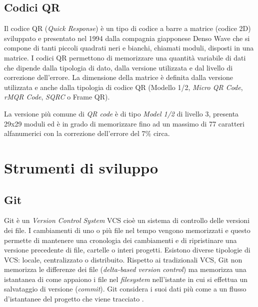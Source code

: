 %
\subsection{Codici QR}
Il codice QR (\textit{Quick Response}) è un tipo di codice a barre a matrice (codice 2D) sviluppato e presentato nel 1994 dalla compagnia giapponese Denso Wave che si compone di tanti piccoli quadrati neri e bianchi, chiamati moduli, disposti in una matrice.
I codici QR permettono di memorizzare una quantità variabile di dati che dipende dalla tipologia di dato, dalla versione utilizzata e dal livello di correzione dell'errore. La dimensione della matrice è definita dalla versione utilizzata e anche dalla tipologia di codice QR (Modello 1/2, \textit{Micro QR Code}, \textit{rMQR Code}, \textit{SQRC} o Frame QR).

La versione più comune di \textit{QR code} è di tipo \textit{Model 1/2} di livello 3, presenta 29x29 moduli ed è in grado di memorizzare fino ad un massimo di 77 caratteri alfanumerici con la correzione dell'errore del 7\% circa.

%
\section{Strumenti di sviluppo}
\subsection{Git}
Git è un \textit{Version Control System} VCS cioè un sistema di controllo delle versioni dei file. I cambiamenti di uno o più file nel tempo vengono memorizzati e questo permette di mantenere una cronologia dei cambiamenti e di ripristinare una versione precedente di file, cartelle o interi progetti. Esistono diverse tipologie di VCS: locale, centralizzato o distribuito.
Rispetto ai tradizionali VCS, Git non memorizza le differenze dei file (\textit{delta-based version control}) ma memorizza una istantanea di come appaiono i file nel \textit{filesystem} nell'istante in cui si effettua un salvataggio di versione (\textit{commit}). Git considera i suoi dati più come a un flusso d'istantanee del progetto che viene tracciato \cite{gitSite}.
%
